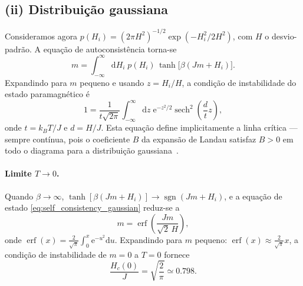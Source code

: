 \documentclass[12pt,a4paper]{article}
\newcommand{\e}{\mathrm{e}}
\newcommand{\dd}{\mathrm{d}}
\newcommand{\sech}{\operatorname{sech}}
\newcommand{\sgn}{\operatorname{sgn}}
\newcommand{\erf}{\operatorname{erf}}
\begin{document}
\subsection*{(ii) Distribuição gaussiana}

Consideramos agora $p(H_i) = (2\pi H^2)^{-1/2}\exp(-H_i^2/2H^2)$,
com $H$ o desvio-padrão. A equação de autoconsistência torna-se
%
\begin{equation}
    m
    =
    \int_{-\infty}^{\infty}\dd H_i\;p(H_i)\,
    \tanh\bigl[\beta(Jm+H_i)\bigr].
    \label{eq:self_consistency_gaussian}
\end{equation}
%
Expandindo para $m$ pequeno e usando $z=H_i/H$, a condição de
instabilidade do estado paramagnético é~\cite{SchneiderPytte1977}
%
\begin{equation}
    \boxed{
    1
    =
    \frac{1}{t\sqrt{2\pi}}
    \int_{-\infty}^{\infty}\dd z\;
    \e^{-z^2/2}
    \sech^2\!\left(\frac{d}{t}z\right),
    }
    \label{eq:critical_gaussian}
\end{equation}
%
onde $t=k_BT/J$ e $d=H/J$.
Esta equação define implicitamente a linha crítica — sempre contínua,
pois o coeficiente $B$ da expansão de Landau satisfaz $B>0$ em todo o
diagrama para a distribuição gaussiana~\cite{Aharony1978a}.

\paragraph{Limite $T\to0$.}
Quando $\beta\to\infty$, $\tanh[\beta(Jm+H_i)]\to\sgn(Jm+H_i)$,
e a equação de estado \eqref{eq:self_consistency_gaussian} reduz-se a
%
\begin{equation}
    m = \erf\!\left(\frac{Jm}{\sqrt{2}\,H}\right),
    \label{eq:gaussian_T0}
\end{equation}
%
onde $\erf(x)=\frac{2}{\sqrt{\pi}}\int_0^x\e^{-u^2}\dd u$.
Expandindo para $m$ pequeno: $\erf(x)\approx\frac{2}{\sqrt{\pi}}x$,
a condição de instabilidade de $m=0$ a $T=0$ fornece
%
\begin{equation}
    \boxed{
    \frac{H_c(0)}{J} = \sqrt{\frac{2}{\pi}} \simeq 0.798.
    }
    \label{eq:gaussian_Hc0}
\end{equation}
\end{document}
